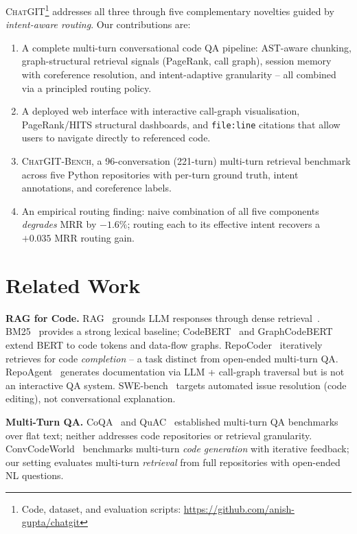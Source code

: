 \documentclass[conference]{IEEEtran}
\newcommand{\chatgit}{\textsc{ChatGIT}\xspace}
\newcommand{\conv}{\textsc{ChatGIT-Bench}\xspace}
\begin{document}
\chatgit\footnote{Code, dataset, and evaluation scripts:
\url{https://github.com/anish-gupta/chatgit}} addresses all three through
five complementary novelties guided by \emph{intent-aware routing}.
Our contributions are:
\begin{enumerate}
  \item A complete multi-turn conversational code QA pipeline: AST-aware
        chunking, graph-structural retrieval signals (PageRank, call graph),
        session memory with coreference resolution, and intent-adaptive
        granularity -- all combined via a principled routing policy.
  \item A deployed web interface with interactive call-graph visualisation,
        PageRank/HITS structural dashboards, and \texttt{file:line}
        citations that allow users to navigate directly to referenced code.
  \item \conv, a 96-conversation (221-turn) multi-turn retrieval benchmark
        across five Python repositories with per-turn ground truth,
        intent annotations, and coreference labels.
  \item An empirical routing finding: naive combination of all five
        components \emph{degrades} MRR by $-1.6\%$; routing each to its
        effective intent recovers a $+0.035$ MRR routing gain.
\end{enumerate}

\section{Related Work}

\textbf{RAG for Code.} RAG~\cite{lewis2021rag} grounds LLM responses
through dense retrieval~\cite{guo2024lightrag}. BM25~\cite{robertson2009bm25}
provides a strong lexical baseline; CodeBERT~\cite{feng2020codebert}
and GraphCodeBERT~\cite{guo2021graphcodebert} extend BERT to code tokens
and data-flow graphs. RepoCoder~\cite{zhang2023repocoder} iteratively
retrieves for code \emph{completion} -- a task distinct from open-ended
multi-turn QA. RepoAgent~\cite{liu2024repoagent} generates documentation
via LLM + call-graph traversal but is not an interactive QA system.
SWE-bench~\cite{jimenez2024swebench} targets automated issue resolution
(code editing), not conversational explanation.

\textbf{Multi-Turn QA.} CoQA~\cite{reddy2019coqa} and
QuAC~\cite{choi2018quac} established multi-turn QA benchmarks over flat
text; neither addresses code repositories or retrieval granularity.
ConvCodeWorld~\cite{han2025convcodeworld} benchmarks multi-turn
\emph{code generation} with iterative feedback; our setting
evaluates multi-turn \emph{retrieval} from full repositories with
open-ended NL questions.
\end{document}
